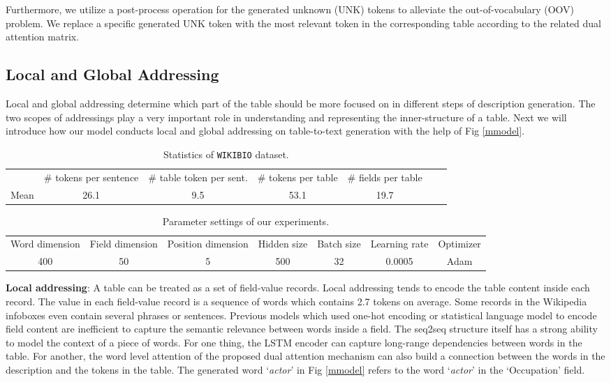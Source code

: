 \documentclass[letterpaper]{article} \usepackage{aaai18}  \usepackage{times}  \usepackage{helvet}  \usepackage{courier}  \usepackage{url}  \usepackage{graphicx}  \frenchspacing  \setlength{\pdfpagewidth}{8.5in}  \setlength{\pdfpageheight}{11in}  \usepackage{amsmath}
\begin{document}
Furthermore, we utilize a post-process operation for the generated unknown (UNK) tokens to alleviate the out-of-vocabulary (OOV) problem. We replace a specific generated UNK token with the most relevant token in the corresponding table according to the related dual attention matrix. 

\subsection{Local and Global Addressing}
Local and global addressing determine which part of the table should be more focused on in different steps of description generation. The two scopes of addressings play a very important role in understanding and representing the inner-structure of a table. 
Next we will introduce how our model conducts local and global addressing on table-to-text generation with the help of Fig \ref{mmodel}.


\begin{table*}[htbp]
\small
\centering
\begin{tabular}{ccccccc}
  \hline 
  & \# tokens per sentence & \# table token per sent.  & \# tokens per table & \# fields per table \\
Mean & 26.1 & 9.5 & 53.1 & 19.7 \\\hline
\end{tabular}
\caption{\label{corpus-stat}Statistics of \texttt{WIKIBIO} dataset.}
\end{table*}

\begin{table*}[htbp]
\small
\centering
\begin{tabular}{ccccccc}
  \hline 
Word dimension & Field dimension & Position dimension & Hidden size & Batch size & Learning rate & Optimizer\\
400 & 50 & 5 & 500 & 32 & 0.0005 & Adam \\\hline
\end{tabular}
\caption{\label{parameter}Parameter settings of our experiments.}
\end{table*}


\textbf{Local addressing}: A table can be treated as a set of field-value records. Local addressing tends to encode the table content inside each record. 
The value in each field-value record is a sequence of words
which contains 2.7 tokens on average.
Some records in the Wikipedia infoboxes even contain several phrases or sentences. 
Previous models which used one-hot encoding or statistical language model to encode field content are inefficient to capture the semantic relevance between words inside a field. 
The seq2seq structure itself has a strong ability to model the context of a piece of words. For one thing, the LSTM encoder can capture long-range dependencies between words in the table. For another, the word level attention of the proposed dual attention mechanism can also build a connection between the words in the description and the tokens in the table. The generated word `\textit{actor}' in Fig \ref{mmodel} refers to the word `\textit{actor}' in the `Occupation' field.
\end{document}
